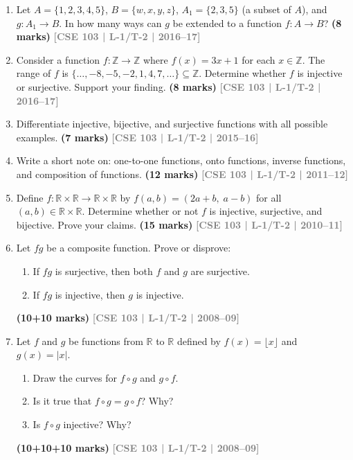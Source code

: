 \documentclass[12pt,a3paper]{article}
\newcommand{\yr}[1]{\hfill\textcolor{gray}{\small\textbf{[#1]}}}
\newcommand{\mk}[1]{\textcolor{orange!70!black}{\small\textbf{(#1 marks)}}}
\begin{document}
\begin{enumerate}
\item Let $A = \{1,2,3,4,5\}$, $B = \{w,x,y,z\}$, $A_1 = \{2,3,5\}$ (a subset of $A$), and $g: A_1 \to B$. In how many ways can $g$ be extended to a function $f: A \to B$?
\mk{8} \yr{CSE 103 | L-1/T-2 | 2016--17}

\item Consider a function $f: \mathbb{Z} \to \mathbb{Z}$ where $f(x) = 3x + 1$ for each $x \in \mathbb{Z}$. The range of $f$ is $\{\ldots, -8, -5, -2, 1, 4, 7, \ldots\} \subseteq \mathbb{Z}$. Determine whether $f$ is injective or surjective. Support your finding.
\mk{8} \yr{CSE 103 | L-1/T-2 | 2016--17}

\item Differentiate injective, bijective, and surjective functions with all possible examples.
\mk{7} \yr{CSE 103 | L-1/T-2 | 2015--16}

\item Write a short note on: one-to-one functions, onto functions, inverse functions, and composition of functions.
\mk{12} \yr{CSE 103 | L-1/T-2 | 2011--12}

\item Define $f: \mathbb{R} \times \mathbb{R} \to \mathbb{R} \times \mathbb{R}$ by $f(a, b) = (2a + b,\; a - b)$ for all $(a, b) \in \mathbb{R} \times \mathbb{R}$. Determine whether or not $f$ is injective, surjective, and bijective. Prove your claims.
\mk{15} \yr{CSE 103 | L-1/T-2 | 2010--11}

\item Let $fg$ be a composite function. Prove or disprove:
\begin{enumerate}
  \item If $fg$ is surjective, then both $f$ and $g$ are surjective.
  \item If $fg$ is injective, then $g$ is injective.
\end{enumerate}
\mk{10+10} \yr{CSE 103 | L-1/T-2 | 2008--09}

\item Let $f$ and $g$ be functions from $\mathbb{R}$ to $\mathbb{R}$ defined by $f(x) = \lfloor x \rfloor$ and $g(x) = |x|$.
\begin{enumerate}
  \item Draw the curves for $f \circ g$ and $g \circ f$.
  \item Is it true that $f \circ g = g \circ f$? Why?
  \item Is $f \circ g$ injective? Why?
\end{enumerate}
\mk{10+10+10} \yr{CSE 103 | L-1/T-2 | 2008--09}


\end{enumerate}
\end{document}
